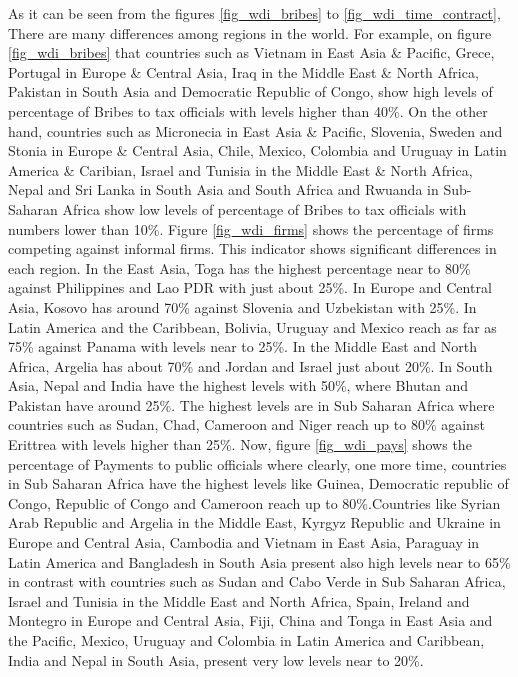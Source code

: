 As it can be seen from the figures \ref{fig_wdi_bribes} to \ref{fig_wdi_time_contract}, There are many differences among regions in the world. 
For example, on figure \ref{fig_wdi_bribes} that countries such as Vietnam in East Asia \& Pacific, Grece, Portugal in Europe \& Central Asia, Iraq in the Middle East \& North Africa, Pakistan in South Asia and Democratic Republic of Congo, show high levels of percentage of Bribes to tax officials with levels higher than 40\%. On the other hand, countries such as Micronecia in East Asia \& Pacific, Slovenia, Sweden and Stonia in Europe \& Central Asia, Chile, Mexico, Colombia and Uruguay in Latin America \& Caribian, Israel and Tunisia in the Middle East \& North Africa, Nepal and Sri Lanka in South Asia and South Africa and Rwuanda in Sub-Saharan Africa show low levels of percentage of Bribes to tax officials with numbers lower than 10\%.
Figure \ref{fig_wdi_firms} shows the percentage of firms competing against informal firms. This indicator shows significant differences in each region. In the East Asia, Toga has the highest percentage near to 80\% against Philippines and Lao PDR with just about 25\%. In Europe and Central Asia, Kosovo has around 70\% against Slovenia and Uzbekistan with 25\%. In Latin America and the Caribbean, Bolivia, Uruguay and Mexico reach as far as 75\% against Panama with levels near to 25\%. In the Middle East and North Africa, Argelia has about 70\% and Jordan and Israel just about 20\%. In South Asia, Nepal and India have the highest levels with 50\%, where Bhutan and Pakistan have around 25\%. The highest levels are in Sub Saharan Africa where countries such as Sudan, Chad, Cameroon and Niger reach up to 80\% against Erittrea with levels higher than 25\%.
Now, figure \ref{fig_wdi_pays} shows the percentage of Payments to public officials where clearly, one more time, countries in Sub Saharan Africa have the highest levels like Guinea, Democratic republic of Congo, Republic of Congo and Cameroon reach up to 80\%.Countries like Syrian Arab Republic and Argelia in the Middle East, Kyrgyz Republic and Ukraine in Europe and Central Asia, Cambodia and Vietnam in East Asia, Paraguay in Latin America and Bangladesh in South Asia present also high levels near to 65\% in contrast with countries such as Sudan and Cabo Verde in Sub Saharan Africa, Israel and Tunisia in the Middle East and North Africa, Spain, Ireland and Montegro in Europe and Central Asia, Fiji, China and Tonga in East Asia and the Pacific, Mexico, Uruguay and Colombia in Latin America and Caribbean, India and Nepal in South Asia, present very low levels near to 20\%.
